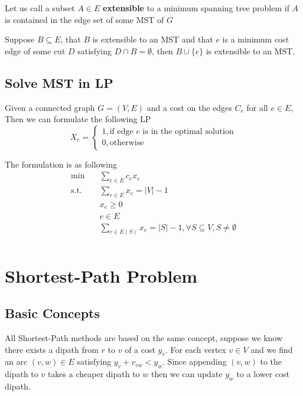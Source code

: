 			\begin{definition}
				Let us call a subset $A \in E$ \textbf{extensible} to a minimum spanning tree problem if $A$ is contained in the edge set of some MST of $G$
			\end{definition}

			\begin{theorem}
				Suppose $B \subseteq E$, that $B$ is extensible to an MST and that $e$ is a minimum cost edge of some cut $D$ satisfying $D\cap B = \emptyset$, then $B\cup \{e\}$ is extensible to an MST.
			\end{theorem}

		\section{Solve MST in LP}
			Given a connected graph $G=(V, E)$ and a cost on the edges $C_e$ for all $e\in E$, Then we can formulate the following LP
			\begin{equation}
				X_e = \begin{cases}
					1, \text{if edge $e$ is in the optimal solution} \\
					0, \text{otherwise}
				\end{cases}
			\end{equation}

			The formulation is as following
			\begin{align}
				\min \quad & \sum_{e\in E} c_ex_e \\
				\text{s.t.} \quad & \sum_{e\in E} x_e = |V| - 1 \\
				                  & x_e \ge 0\\
				                  & e\in E \\
				                  & \sum_{e\in E(S)} x_e = |S| - 1, \forall S\subseteq V, S\ne \emptyset \\
			\end{align}

	\chapter{Shortest-Path Problem}
		\section{Basic Concepts}
			All Shortest-Path methods are based on the same concept, suppose we know there exists a dipath from $r$ to $v$ of a cost $y_v$. For each vertex $v \in V$ and we find an arc $(v, w) \in E$ satisfying $y_v + v_{vw} < y_w$. Since appending $(v, w)$ to the dipath to $v$ takes a cheaper dipath to $w$ then we can update $y_w$ to a lower cost dipath.

